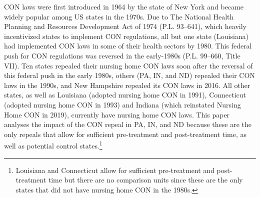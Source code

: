 \documentclass[../Main.tex]{subfiles}
\begin{document}
CON laws were first introduced in 1964 by the state of New York and became widely popular among US states in the 1970s. Due to The National Health Planning and Resources Development Act of 1974 (P.L. 93–641), which heavily incentivized states to implement CON regulations, all but one state (Louisiana) had implemented CON laws in some of their health sectors by 1980. This federal push for CON regulations was reversed in the early-1980s (P.L. 99–660, Title VII). Ten states repealed their nursing home CON laws soon after the reversal of this federal push in the early 1980s, others (PA, IN, and ND) repealed their CON laws in the 1990s, and New Hampshire repealed its CON laws in 2016. All other states, as well as Louisiana (adopted nursing home CON in 1991), Connecticut (adopted nursing home CON in 1993) and Indiana (which reinstated Nursing Home CON in 2019), currently have nursing home CON laws. This paper analyses the impact of the CON repeal in PA, IN, and ND because these are the only repeals that allow for sufficient pre-treatment and post-treatment time, as well as potential control states.\footnote{Louisiana and Connecticut allow for sufficient pre-treatment and post-treatment time but there are no comparison units since these are the only states that did not have nursing home CON in the 1980s.}



\end{document}
